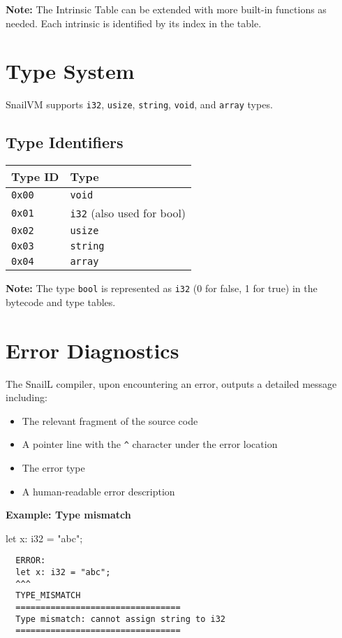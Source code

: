 \documentclass[a4paper,12pt]{article}
\begin{document}
    \textbf{Note:} The Intrinsic Table can be extended with more built-in functions as needed. Each intrinsic is identified by its index in the table.

    \section{Type System}
    SnailVM supports \texttt{i32}, \texttt{usize}, \texttt{string}, \texttt{void}, and \texttt{array} types.

    \subsection{Type Identifiers}
    \begin{tabular}{|l|l|}
        \hline
        \textbf{Type ID} & \textbf{Type} \\ \hline
        \texttt{0x00} & \texttt{void} \\ \hline
        \texttt{0x01} & \texttt{i32} (also used for bool) \\ \hline
        \texttt{0x02} & \texttt{usize} \\ \hline
        \texttt{0x03} & \texttt{string} \\ \hline
        \texttt{0x04} & \texttt{array} \\ \hline
    \end{tabular}
    \label{tab:type_identifiers}

    \textbf{Note:} The type \texttt{bool} is represented as \texttt{i32} (0 for false, 1 for true) in the bytecode and type tables.

    \section{Error Diagnostics}

    The SnailL compiler, upon encountering an error, outputs a detailed message including:
    \begin{itemize}
        \item The relevant fragment of the source code
        \item A pointer line with the \texttt{^} character under the error location
        \item The error type
        \item A human-readable error description
    \end{itemize}

    \textbf{Example: Type mismatch}
    \begin{snailcode}
        let x: i32 = "abc";
    \end{snailcode}
    \begin{verbatim}
  ERROR:
  let x: i32 = "abc";
  ^^^
  TYPE_MISMATCH
  =================================
  Type mismatch: cannot assign string to i32
  =================================
    \end{verbatim}
\end{document}
